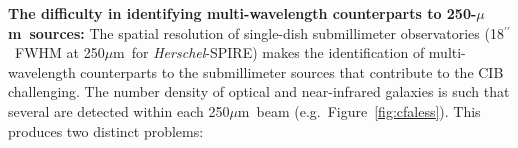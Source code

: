 \documentclass[12pt,a4paper]{article}
\newcommand{\herschel}{{\it Herschel}}
\newcommand{\spitzer}{{\it Spitzer}}
\newcommand{\micron}{$\mu$m}
\newcommand{\arcsec}{$^{\prime\prime}$}
\begin{document}
%
%
%
%

\vspace{0.3cm}
{\bf The difficulty in identifying multi-wavelength counterparts to
  250-\micron\ sources:}
%
The spatial resolution of single-dish submillimeter observatories 
(18\arcsec\ FWHM at 250\micron\ for \herschel-SPIRE) makes the
identification of multi-wavelength counterparts to the submillimeter
sources that  contribute to the CIB challenging. The number density of
optical and near-infrared galaxies is such that several are detected
within each 250\micron\ beam (e.g.\ Figure~\ref{fig:cfaless}). This produces two distinct problems: 
\end{document}
